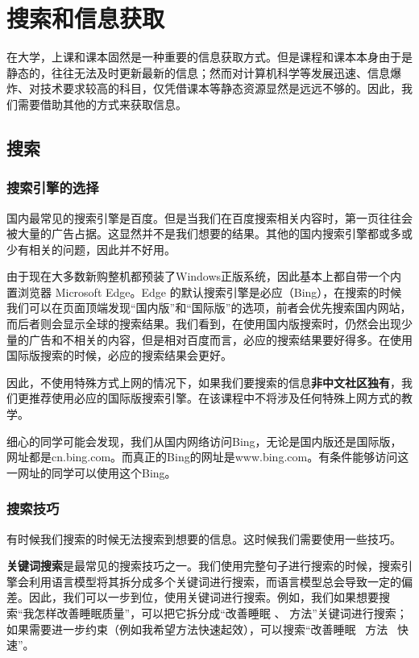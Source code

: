 \documentclass[../main.tex]{subfiles}
\begin{document}
\chapter{搜索和信息获取} %

在大学，上课和课本固然是一种重要的信息获取方式。但是课程和课本本身由于是静态的，往往无法及时更新最新的信息；然而对计算机科学等发展迅速、信息爆炸、对技术要求较高的科目，仅凭借课本等静态资源显然是远远不够的。因此，我们需要借助其他的方式来获取信息。

\section{搜索}

\subsection{搜索引擎的选择}

国内最常见的搜索引擎是百度。但是当我们在百度搜索相关内容时，第一页往往会被大量的广告占据。这显然并不是我们想要的结果。其他的国内搜索引擎都或多或少有相关的问题，因此并不好用。

由于现在大多数新购整机都预装了Windows正版系统，因此基本上都自带一个内置浏览器 Microsoft Edge。Edge 的默认搜索引擎是必应（Bing），在搜索的时候我们可以在页面顶端发现“国内版”和“国际版”的选项，前者会优先搜索国内网站，而后者则会显示全球的搜索结果。我们看到，在使用国内版搜索时，仍然会出现少量的广告和不相关的内容，但是相对百度而言，必应的搜索结果要好得多。在使用国际版搜索的时候，必应的搜索结果会更好。

因此，不使用特殊方式上网的情况下，如果我们要搜索的信息\textbf{非中文社区独有}，我们更推荐使用必应的国际版搜索引擎。在该课程中不将涉及任何特殊上网方式的教学。

\begin{tcolorbox}[title=说明]
  细心的同学可能会发现，我们从国内网络访问Bing，无论是国内版还是国际版，网址都是cn.bing.com。而真正的Bing的网址是www.bing.com。有条件能够访问这一网址的同学可以使用这个Bing。
\end{tcolorbox}

\subsection{搜索技巧}

有时候我们搜索的时候无法搜索到想要的信息。这时候我们需要使用一些技巧。

\textbf{关键词搜索}是最常见的搜索技巧之一。我们使用完整句子进行搜索的时候，搜索引擎会利用语言模型将其拆分成多个关键词进行搜索，而语言模型总会导致一定的偏差。因此，我们可以一步到位，使用关键词进行搜索。例如，我们如果想要搜索“我怎样改善睡眠质量”，可以把它拆分成“改善睡眠 、 方法”关键词进行搜索；如果需要进一步约束（例如我希望方法快速起效），可以搜索“改善睡眠 \ 方法 \ 快速”。
\end{document}
